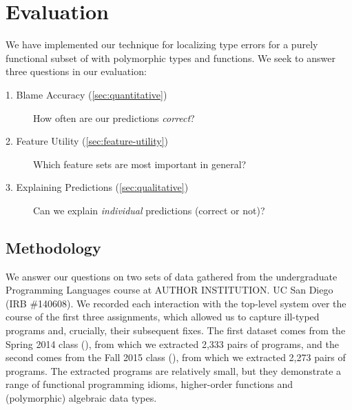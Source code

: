\section{Evaluation}
\label{sec:evaluation}


We have implemented our technique for localizing type errors for a
purely functional subset of \ocaml with polymorphic types and functions.
%
We seek to answer three questions in our evaluation:
%
\begin{description}
\item[1. Blame Accuracy (\autoref{sec:quantitative})]
  How often are our predictions \emph{correct}?
\item[2. Feature Utility (\autoref{sec:feature-utility})]
  Which feature sets are most important in general?
\item[3. Explaining Predictions (\autoref{sec:qualitative})]
  Can we explain \emph{individual} predictions (correct or not)?
\end{description}

\subsection{Methodology}
\label{sec:methodology}

We answer our questions on two sets of data gathered from the
undergraduate Programming Languages course at
\if@anonymous
AUTHOR INSTITUTION.
\else
UC San Diego (IRB \#140608).
\fi
%
We recorded each interaction with the \ocaml top-level system over the
course of the first three assignments, which allowed us to capture
ill-typed programs and, crucially, their subsequent fixes.
%
The first dataset comes from the Spring 2014 class (\SPRING), from which
we extracted 2,333 pairs of programs, and the second comes from the Fall
2015 class (\FALL), from which we extracted 2,273 pairs of programs.
%
The extracted programs are relatively small, but they demonstrate a
range of functional programming idioms, \eg higher-order functions and
(polymorphic) algebraic data types.

